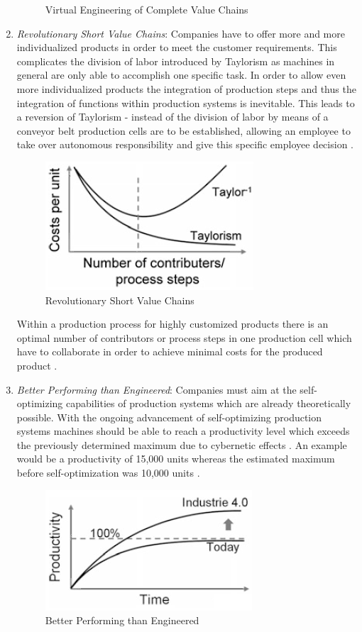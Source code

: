 \begin{enumerate}
\begin{figure}[h!]
\centering
\caption{Virtual Engineering of Complete Value Chains \cite{IN4HYPO}}
\label{fig:2.3}
\end{figure}
\item \textit{Revolutionary Short Value Chains}: Companies have to offer more and more individualized products in order to meet the customer requirements. This complicates the division of labor introduced by Taylorism as machines in general are only able to accomplish one specific task. In order to allow even more individualized products the integration of production steps and thus the integration of functions within production systems is inevitable. This leads to a reversion of Taylorism - instead of the division of labor by means	of a conveyor belt production cells are to be established, allowing an employee to take over autonomous responsibility and give this specific employee decision \cite{IN4HYPO}. 
\begin{figure}[h!]
\includegraphics[scale=0.5]{./gfx/revvalchain}
\centering
\caption{Revolutionary Short Value Chains \cite{IN4HYPO}}
\label{fig:2.4}
\end{figure}

Within a production process for highly customized products there is an optimal number of contributors or process steps in one production cell which have to collaborate in order to achieve minimal costs for the produced product  \cite{IN4HYPO}.
\item \textit{Better Performing than Engineered}: Companies must aim at the self-optimizing	capabilities of production systems which are already theoretically possible. With the ongoing advancement of self-optimizing production systems machines should be able to reach a productivity level which exceeds the previously determined maximum due to cybernetic effects . An example would be a productivity of 15,000 units whereas the estimated maximum before self-optimization was 10,000 units \cite{IN4HYPO}.
\begin{figure}[h!]
\includegraphics[scale=0.5]{./gfx/revengg}
\centering
\caption{Better Performing than Engineered \cite{IN4HYPO}}
\label{fig:2.5}
\end{figure}
\end{enumerate}
